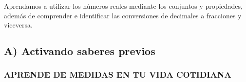 \documentclass[12pt,a4paper]{article}
\begin{document}
\vspace{0.5cm}

\begin{center}
\begin{tcolorbox}[colback=fondorosa,colframe=rojoclaro,title=\textbf{ACTIVIDAD 1: NÚMEROS REALES},fonttitle=\bfseries,width=\textwidth]
\centering
Aprendamos a utilizar los números reales mediante los conjuntos y propiedades, además de comprender e identificar las conversiones de decimales a fracciones y viceversa.
\end{tcolorbox}
\end{center}

\vspace{0.5cm}

\subsection*{A) Activando saberes previos}

\subsubsection*{APRENDE DE MEDIDAS EN TU VIDA COTIDIANA}
\end{document}
